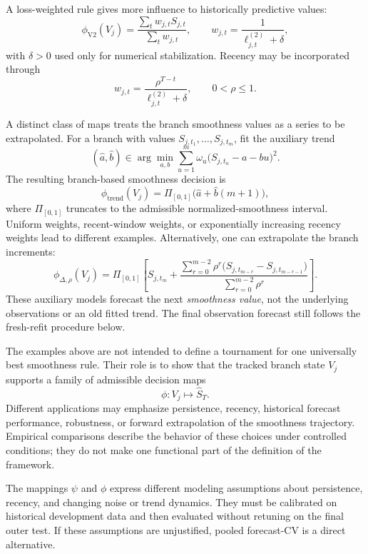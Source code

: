 A loss-weighted rule gives more influence to historically predictive values:
\begin{equation}
\label{eq:rule_validation2}
\phi_{\mathrm{V2}}(V_j)
=
\frac{
\sum_t w_{j,t}S_{j,t}
}{
\sum_t w_{j,t}
},
\qquad
w_{j,t}
=
\frac{1}{\ell^{(2)}_{j,t}+\delta},
\end{equation}
with $\delta>0$ used only for numerical stabilization. Recency may be incorporated through
\begin{equation}
\label{eq:recency_validation2_weights}
w_{j,t}
=
\frac{\rho^{T-t}}{\ell^{(2)}_{j,t}+\delta},
\qquad
0<\rho\le1.
\end{equation}

A distinct class of maps treats the branch smoothness values as a series to be extrapolated. For a branch with values $S_{j,t_1},\ldots,S_{j,t_m}$, fit the auxiliary trend
\begin{equation}
\label{eq:branch_linear_fit}
(\widehat a,\widehat b)
\in
\arg\min_{a,b}
\sum_{u=1}^{m}
\omega_u\bigl(S_{j,t_u}-a-bu\bigr)^2.
\end{equation}
The resulting branch-based smoothness decision is
\begin{equation}
\label{eq:rule_linear_trend}
\phi_{\mathrm{trend}}(V_j)
=
\Pi_{[0,1]}\bigl(\widehat a+\widehat b(m+1)\bigr),
\end{equation}
where $\Pi_{[0,1]}$ truncates to the admissible normalized-smoothness interval. Uniform weights, recent-window weights, or exponentially increasing recency weights lead to different examples. Alternatively, one can extrapolate the branch increments:
\begin{equation}
\label{eq:rule_increment_extrapolation}
\phi_{\Delta,\rho}(V_j)
=
\Pi_{[0,1]}
\left[
S_{j,t_m}
+
\frac{
\sum_{r=0}^{m-2}
\rho^r\bigl(S_{j,t_{m-r}}-S_{j,t_{m-r-1}}\bigr)
}{
\sum_{r=0}^{m-2}\rho^r
}
\right].
\end{equation}
These auxiliary models forecast the next \emph{smoothness value}, not the underlying observations or an old fitted trend. The final observation forecast still follows the fresh-refit procedure below.

The examples above are not intended to define a tournament for one universally best smoothness rule. Their role is to show that the tracked branch state $V_j$ supports a family of admissible decision maps
\begin{equation}
\label{eq:branch_decision_map}
\phi:V_j\mapsto \widehat S_T.
\end{equation}
Different applications may emphasize persistence, recency, historical forecast performance, robustness, or forward extrapolation of the smoothness trajectory. Empirical comparisons describe the behavior of these choices under controlled conditions; they do not make one functional part of the definition of the framework.


The mappings $\psi$ and $\phi$ express different modeling assumptions
about persistence, recency, and changing noise or trend dynamics.
They must be calibrated on historical development data and then
evaluated without retuning on the final outer test. If these assumptions are unjustified, pooled forecast-CV is a direct alternative.
